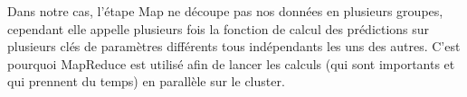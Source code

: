 Dans notre cas, l'étape Map ne découpe pas nos données en plusieurs groupes, cependant elle appelle plusieurs fois la fonction de calcul des prédictions sur plusieurs clés de paramètres différents tous indépendants les uns des autres. C'est pourquoi MapReduce est utilisé afin de lancer les calculs (qui sont importants et qui prennent du temps) en parallèle sur le cluster. 





